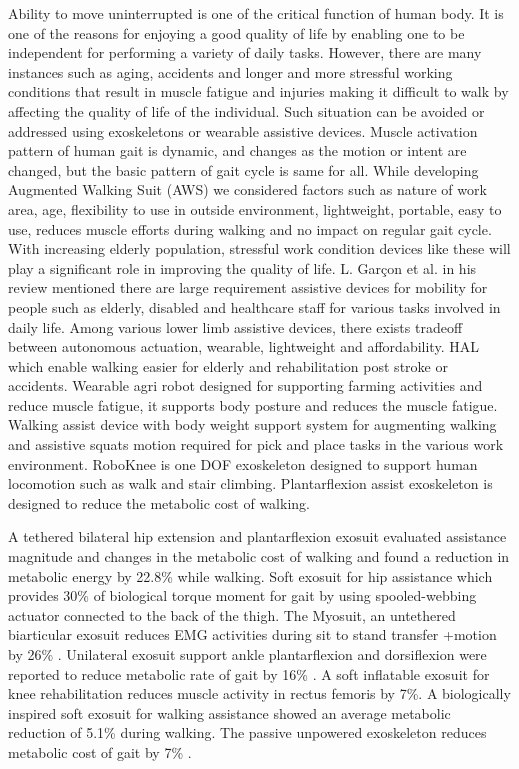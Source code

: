 \documentclass[letterpaper, 10 pt, conference]{ieeeconf}  %
\begin{document}
Ability to move uninterrupted is one of the critical function of human body. It is one of the reasons for enjoying a good quality of life by enabling one to be independent for performing a variety of daily tasks. However, there are many instances such as aging, accidents and longer and more stressful working conditions that result in muscle fatigue and injuries making it difficult to walk by affecting the quality of life of the individual. Such situation can be avoided or addressed using exoskeletons or wearable assistive devices. Muscle activation pattern of human gait is dynamic, and changes as the motion or intent are changed, but the basic pattern of gait cycle is same for all. While developing Augmented Walking Suit (AWS) we considered factors such as nature of work area, age, flexibility to use in outside environment, lightweight, portable, easy to use, reduces muscle efforts during walking and no impact on regular gait cycle. With increasing elderly population, stressful work condition devices like these will play a significant role in improving the quality of life. L. Garçon et al. \cite{1} in his review mentioned there are large requirement assistive devices for mobility for people such as elderly, disabled and healthcare staff for various tasks involved in daily life. Among various lower limb assistive devices, there exists tradeoff between autonomous actuation, wearable, lightweight and affordability. HAL \cite{2} which enable walking easier for elderly and rehabilitation post stroke or accidents. Wearable agri robot \cite{3} designed for supporting farming activities and reduce muscle fatigue, it supports body posture and reduces the muscle fatigue. Walking assist device with body weight support system \cite{4} for augmenting walking and assistive squats motion required for pick and place tasks in the various work environment. RoboKnee \cite{5} is one DOF exoskeleton designed to support human locomotion such as walk and stair climbing. Plantarflexion assist exoskeleton \cite{6} is designed to reduce the metabolic cost of walking.

A tethered bilateral hip extension and plantarflexion exosuit \cite{7} evaluated assistance magnitude and changes in the metabolic cost of walking and found a reduction in metabolic energy by 22.8\% while walking. Soft exosuit for hip assistance which provides 30\% of biological torque moment for gait \cite{8} by using spooled-webbing actuator connected to the back of the thigh. The Myosuit, an untethered biarticular exosuit reduces EMG activities during sit to stand transfer +motion by 26\% \cite{9}. Unilateral exosuit support ankle plantarflexion and dorsiflexion were reported to reduce metabolic rate of gait by 16\% \cite{10}. A soft inflatable exosuit for knee rehabilitation \cite{11} reduces muscle activity in rectus femoris by 7\%. A biologically inspired soft exosuit for walking assistance \cite{12} showed an average metabolic reduction of 5.1\% during walking. The passive unpowered exoskeleton reduces metabolic cost of gait by 7\% \cite{13}.
\end{document}
